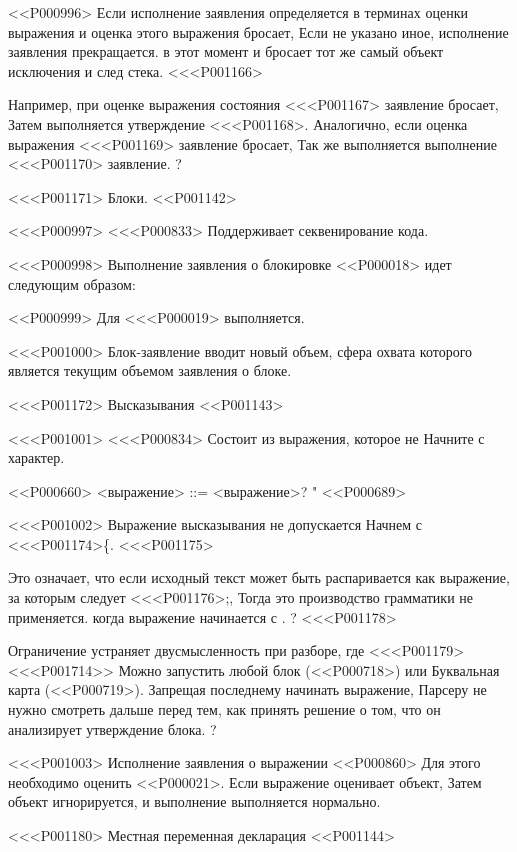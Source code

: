 <<P000996>%
Если исполнение заявления определяется в терминах оценки выражения
и оценка этого выражения бросает,
Если не указано иное, исполнение заявления прекращается.
в этот момент и бросает тот же самый объект исключения и след стека.
<<<P001166>{%
Например,
при оценке выражения состояния <<<P001167>{} заявление бросает,
Затем выполняется утверждение <<<P001168>{}.
Аналогично, если оценка выражения <<<P001169> заявление бросает,
Так же выполняется выполнение <<<P001170>{} заявление.%
?



<<<P001171> Блоки.
<<P001142>

<<<P000997>%
<<<P000833> Поддерживает секвенирование кода.

<<<P000998>%
Выполнение заявления о блокировке <<P000018> идет следующим образом:

<<P000999>%
Для <<<P000019> выполняется.

<<<P001000>%
Блок-заявление вводит новый объем,
сфера охвата которого является текущим объемом заявления о блоке.


<<<P001172> Высказывания
<<P001143>

<<<P001001>%
<<<P000834> Состоит из выражения, которое не
Начните с \lit{\{} характер.

<<P000660>
<выражение> ::= <выражение>? "
<<P000689>

<<<P001002>%
Выражение высказывания не допускается
Начнем с <<<P001174>{\{}.
<<<P001175>{%
Это означает, что если исходный текст может быть
распаривается как выражение, за которым следует <<<P001176>{;},
Тогда это производство грамматики не применяется.
когда выражение начинается с \lit{\{}.%
?
<<<P001178>{%
Ограничение устраняет двусмысленность при разборе, где
<<<P001179><<<P001714>> Можно запустить любой блок (<<P000718>) или
Буквальная карта (<<P000719>).
Запрещая последнему начинать выражение,
Парсеру не нужно смотреть дальше
перед тем, как принять решение о том, что он анализирует утверждение блока.%
?

<<<P001003>%
Исполнение заявления о выражении <<P000860> Для этого необходимо оценить <<P000021>.
Если выражение оценивает объект,
Затем объект игнорируется, и выполнение выполняется нормально.


<<<P001180> Местная переменная декларация
<<P001144>

}}}
